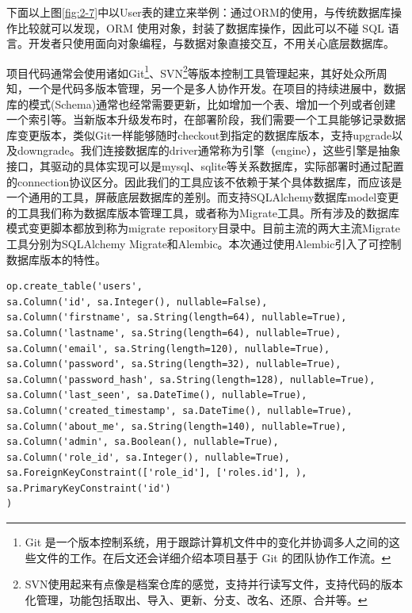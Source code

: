 下面以上图\ref{fig:2-7}中以User表的建立来举例：通过ORM的使用，与传统数据库操作比较就可以发现，ORM 使用对象，封装了数据库操作，因此可以不碰 SQL 语言。开发者只使用面向对象编程，与数据对象直接交互，不用关心底层数据库。

项目代码通常会使用诸如Git\footnote{Git 是一个版本控制系统，用于跟踪计算机文件中的变化并协调多人之间的这些文件的工作。在后文还会详细介绍本项目基于 Git 的团队协作工作流。}、SVN\footnote{SVN使用起来有点像是档案仓库的感觉，支持并行读写文件，支持代码的版本化管理，功能包括取出、导入、更新、分支、改名、还原、合并等。}等版本控制工具管理起来，其好处众所周知，一个是代码多版本管理，另一个是多人协作开发。在项目的持续进展中，数据库的模式(Schema)通常也经常需要更新，比如增加一个表、增加一个列或者创建一个索引等。当新版本升级发布时，在部署阶段，我们需要一个工具能够记录数据库变更版本，类似Git一样能够随时checkout到指定的数据库版本，支持upgrade以及downgrade。我们连接数据库的driver通常称为引擎（engine），这些引擎是抽象接口，其驱动的具体实现可以是mysql、sqlite等关系数据库，实际部署时通过配置的connection协议区分。因此我们的工具应该不依赖于某个具体数据库，而应该是一个通用的工具，屏蔽底层数据库的差别。而支持SQLAlchemy数据库model变更的工具我们称为数据库版本管理工具，或者称为Migrate工具。所有涉及的数据库模式变更脚本都放到称为migrate repository目录中。目前主流的两大主流Migrate工具分别为SQLAlchemy Migrate和Alembic。本次通过使用Alembic引入了可控制数据库版本的特性。

\begin{lstlisting}
op.create_table('users',
sa.Column('id', sa.Integer(), nullable=False),
sa.Column('firstname', sa.String(length=64), nullable=True),
sa.Column('lastname', sa.String(length=64), nullable=True),
sa.Column('email', sa.String(length=120), nullable=True),
sa.Column('password', sa.String(length=32), nullable=True),
sa.Column('password_hash', sa.String(length=128), nullable=True),
sa.Column('last_seen', sa.DateTime(), nullable=True),
sa.Column('created_timestamp', sa.DateTime(), nullable=True),
sa.Column('about_me', sa.String(length=140), nullable=True),
sa.Column('admin', sa.Boolean(), nullable=True),
sa.Column('role_id', sa.Integer(), nullable=True),
sa.ForeignKeyConstraint(['role_id'], ['roles.id'], ),
sa.PrimaryKeyConstraint('id')
)
\end{lstlisting}

